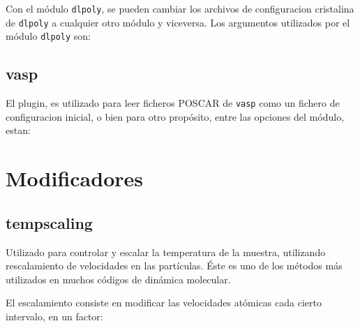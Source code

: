 Con el m\'odulo \verb|dlpoly|, se pueden cambiar los archivos de configuracion cristalina de \verb|dlpoly| a cualquier otro m\'odulo y viceversa. Los argumentos utilizados por el m\'odulo \verb|dlpoly| son:


\subsection{vasp}
El plugin, es utilizado para leer ficheros POSCAR de \verb|vasp| como un fichero de configuracion inicial, o bien para otro prop\'osito, entre las opciones del m\'odulo, estan:

\section{Modificadores}
\subsection{tempscaling}

Utilizado para controlar y escalar la temperatura de la muestra, utilizando rescalamiento de velocidades en las part\'iculas. \'Este es uno de los m\'etodos m\'as utilizados en muchos c\'odigos de din\'amica molecular.

El escalamiento consiste en modificar las velocidades at\'omicas cada cierto intervalo, en un factor:

